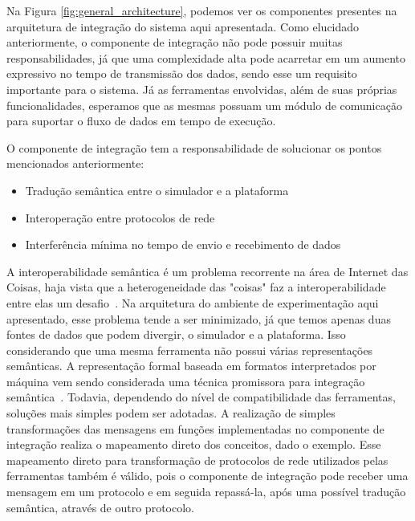 Na Figura \ref{fig:general_architecture}, podemos ver os componentes presentes na arquitetura de integração do sistema aqui apresentada.
Como elucidado anteriormente, o componente de integração não pode possuir muitas responsabilidades, já que uma complexidade alta pode acarretar em um aumento expressivo no
tempo de transmissão dos dados, sendo esse um requisito importante para o sistema.
Já as ferramentas envolvidas, além de suas próprias funcionalidades, esperamos que as mesmas possuam um módulo de comunicação para suportar o fluxo de dados em tempo de execução.

O componente de integração tem a responsabilidade de solucionar os pontos mencionados anteriormente:

\begin{itemize}
    \item Tradução semântica entre o simulador e a plataforma

    \item Interoperação entre protocolos de rede

    \item Interferência mínima no tempo de envio e recebimento de dados
\end{itemize}

A interoperabilidade semântica é um problema recorrente na área de Internet das Coisas, haja vista que a heterogeneidade das "coisas"  faz a interoperabilidade entre elas um desafio~\cite{barnaghi_2012}.
Na arquitetura do ambiente de experimentação aqui apresentado, esse problema tende a ser minimizado, já que temos apenas duas fontes de dados que podem divergir, o simulador e a plataforma.
Isso considerando que uma mesma ferramenta não possui várias representações semânticas.
A representação formal baseada em formatos interpretados por máquina vem sendo considerada uma técnica promissora para integração semântica~\cite{barnaghi_2012}.
Todavia, dependendo do nível de compatibilidade das ferramentas, soluções mais simples podem ser adotadas.
A realização de simples transformações das mensagens em funções implementadas no componente de integração realiza o mapeamento direto dos conceitos, dado o exemplo.
Esse mapeamento direto para transformação de protocolos de rede utilizados pelas ferramentas também é válido, pois o componente de integração pode receber uma mensagem em um protocolo e em seguida repassá-la, 
após uma possível tradução semântica, através de outro protocolo.


